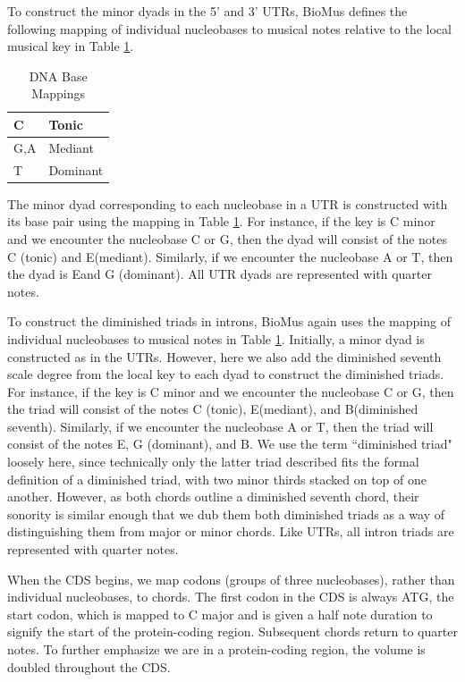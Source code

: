 \documentclass[letterpaper]{article}
\begin{document}
To construct the minor dyads in the 5' and 3' UTRs, BioMus defines the following mapping of individual nucleobases to musical notes relative to the local musical key in Table  \ref{table:nucleobases}.

\begin{table}[h!]
\centering
\begin{tabular}{|l|l|}
\hline
C   & Tonic    \\ \hline
G,A & Mediant  \\ \hline
T   & Dominant \\ \hline
\end{tabular}
\caption{DNA Base Mappings}
\label{table:nucleobases}
\end{table}

The minor dyad corresponding to each nucleobase in a UTR is constructed with its base pair using the mapping in Table  \ref{table:nucleobases}. For instance, if the key is C minor and we encounter the nucleobase C or G, then the dyad will consist of the notes C (tonic) and E\musFlat (mediant). Similarly, if we encounter the nucleobase A or T, then the dyad is E\musFlat and G (dominant). All UTR dyads are represented with quarter notes.

To construct the diminished triads in introns, BioMus again uses the mapping of individual nucleobases to musical notes in Table  \ref{table:nucleobases}. Initially, a minor dyad is constructed as in the UTRs. However, here we also add the diminished seventh scale degree from the local key to each dyad to construct the diminished triads. For instance, if the key is C minor and we encounter the nucleobase C or G, then the triad will consist of the notes C (tonic), E\musFlat (mediant), and B\musDoubleFlat (diminished seventh). Similarly, if we encounter the nucleobase A or T, then the triad will consist of the notes E\musFlat, G (dominant), and B\musDoubleFlat. We use the term ``diminished triad" loosely here, since technically only the latter triad described fits the formal definition of a diminished triad, with two minor thirds stacked on top of one another. However, as both chords outline a diminished seventh chord, their sonority is similar enough that we dub them both diminished triads as a way of distinguishing them from major or minor chords. Like UTRs, all intron triads are represented with quarter notes. 

When the CDS begins, we map codons (groups of three nucleobases), rather than individual nucleobases, to chords. The first codon in the CDS is always ATG, the start codon, which is mapped to C major and is given a half note duration to signify the start of the protein-coding region. Subsequent chords return to quarter notes. To further emphasize we are in a protein-coding region, the volume is doubled throughout the CDS. 
\end{document}
